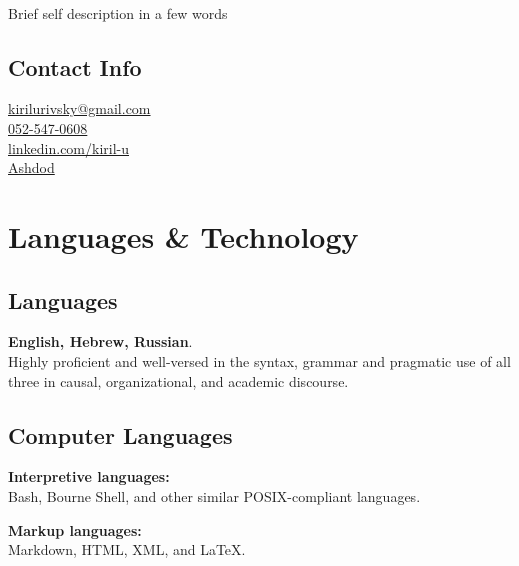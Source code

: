 \documentclass[]{rahulworld-resume}
\begin{document}
%
%

\begin{minipage}[t]{0.33\textwidth} 
\begin{large}
	\\
\end{large}

Brief self description in a few words
\vspace{8pt}

\subsection{Contact Info} 

\href{mailto:kirilurivsky@gmail.com}{kirilurivsky@gmail.com} \\
\href{tel:972525470608}{052-547-0608} \\
\href{https://www.linkedin.com/in/kiril-u}{linkedin.com/kiril-u} \\
\href{https://goo.gl/maps/MSacjpSy7vZSKykP7}{Ashdod} 
\section{Languages \& Technology} 
\subsection{Languages}
\textbf{English, Hebrew, Russian}.\\
Highly proficient and well-versed in the syntax, grammar and pragmatic use of all three in causal, organizational, and academic discourse.
\vspace{2pt}
\subsection{Computer Languages}
\textbf{Interpretive languages:} \\
Bash, Bourne Shell, and other similar POSIX-compliant languages. 

\textbf{Markup languages:} \\
Markdown, HTML, XML, and LaTeX.
\vspace{2pt}

\end{minipage}
\end{document}

